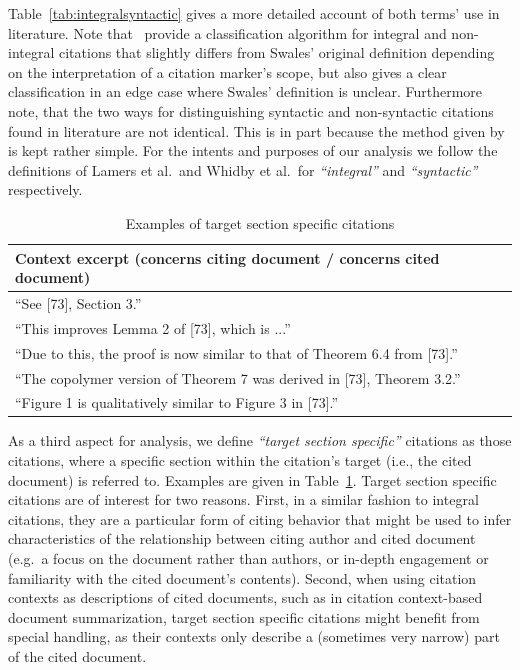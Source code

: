 Table~\ref{tab:integralsyntactic} gives a more detailed account of both terms' use in literature. Note that~\cite{Lamers2018} provide a classification algorithm for integral and non-integral citations that slightly differs from Swales' original definition depending on the interpretation of a citation marker's scope, but also gives a clear classification in an edge case where Swales' definition is unclear. Furthermore note, that the two ways for distinguishing syntactic and non-syntactic citations found in literature are not identical. This is in part because the method given by~\cite{Abujbara2012} is kept rather simple. For the intents and purposes of our analysis we follow the definitions of Lamers et al.\ and Whidby et al.\ for \emph{``integral''} and \emph{``syntactic''} respectively.

\begin{table}
\centering
    \caption{Examples of target section specific citations}
    \label{tab:secspec}
\begin{center}
    \begin{tabular}{l}
    \toprule
    Context excerpt ({\color{UniBlue}concerns citing document} / {\color{RandomRed}concerns cited document}) \\
    \midrule
    ``See [73], {\color{RandomRed}Section 3}.'' \\
    ``This improves {\color{RandomRed}Lemma 2} of [73], which is ...'' \\
    ``Due to this, the proof is now similar to that of {\color{RandomRed}Theorem 6.4} from [73].'' \\
    ``The copolymer version of {\color{UniBlue}Theorem 7} was derived in [73], {\color{RandomRed}Theorem 3.2}.''  \\
    ``{\color{UniBlue}Figure 1} is qualitatively similar to {\color{RandomRed}Figure 3} in [73].'' \\
    \bottomrule
    \end{tabular}
\end{center}
\end{table}

As a third aspect for analysis, we define \emph{``target section specific''} citations as those citations, where a specific section within the citation's target (i.e., the cited document) is referred to. Examples are given in Table~\ref{tab:secspec}. Target section specific citations are of interest for two reasons. First, in a similar fashion to integral citations, they are a particular form of citing behavior that might be used to infer characteristics of the relationship between citing author and cited document (e.g.\ a focus on the document rather than authors, or in-depth engagement or familiarity with the cited document's contents). Second, when using citation contexts as descriptions of cited documents, such as in citation context-based document summarization, target section specific citations might benefit from special handling, as their contexts only describe a (sometimes very narrow) part of the cited document.

